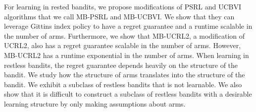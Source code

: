 For learning in rested bandits, we propose modifications of PSRL and UCBVI algorithms that we call MB-PSRL and MB-UCBVI.
We show that they can leverage Gittins index policy to have a regret guarantee and a runtime scalable in the number of arms.
Furthermore, we show that MB-UCRL2, a modification of UCRL2, also has a regret guarantee scalable in the number of arms.
However, MB-UCRL2 has a runtime exponential in the number of arms.
When learning in restless bandits, the regret guarantee depends heavily on the structure of the bandit.
We study how the structure of arms translates into the structure of the bandit.
We exhibit a subclass of restless bandits that is not learnable.
We also show that it is difficult to construct a subclass of restless bandits with a desirable learning structure by only making assumptions about arms.
